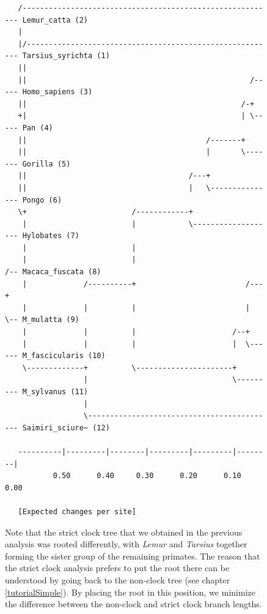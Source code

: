 \documentclass[12pt]{book}
\begin{document}
\begin{figure}[h]
\begin{singlespacing}
\begin{verbatim}
   /---------------------------------------------------------- Lemur_catta (2)
   |                                                                               
   |/--------------------------------------------------------- Tarsius_syrichta (1)
   ||                                                                              
   ||                                                   /----- Homo_sapiens (3)
   ||                                                 /-+                          
   +|                                                 | \----- Pan (4)
   ||                                         /-------+                            
   ||                                         |       \------- Gorilla (5)
   ||                                     /---+                                    
   ||                                     |   \--------------- Pongo (6)
   \+                        /------------+                                        
    |                        |            \------------------- Hylobates (7)
    |                        |                                                     
    |                        |                             /-- Macaca_fuscata (8)
    |             /----------+                         /---+                       
    |             |          |                         |   \-- M_mulatta (9)
    |             |          |                      /--+                           
    |             |          |                      |  \------ M_fascicularis (10)
    \-------------+          \----------------------+                              
                  |                                 \--------- M_sylvanus (11)
                  |                                                                
                  \------------------------------------------- Saimiri_sciure~ (12)
                                                                                   
   ----------|---------|--------|---------|---------|--------|                     
           0.50      0.40     0.30      0.20      0.10     0.00 

   [Expected changes per site]
\end{verbatim}
\end{singlespacing}
\normalsize

Note that the strict clock tree that we obtained in the previous analysis was rooted differently,
with \textit{Lemur} and \textit{Tarsius} together forming the sister group of the remaining
primates. The reason that the strict clock analysis prefers to put the root there can be understood
by going back to the non-clock tree (see chapter \ref{tutorialSimple}). By placing the root in this
position, we minimize the difference between the non-clock and strict clock branch lengths.


\end{figure}
\end{document}
